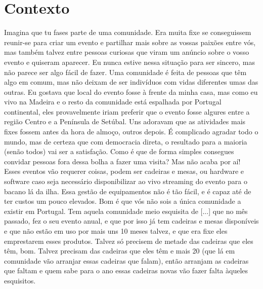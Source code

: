 \documentclass[12pt,a4paper,openright,oneside]{memoir}
\begin{document}
\section{Contexto}

Imagina que tu fases parte de uma comunidade. Era muita fixe se conseguissem
reunir-se para criar um evento e partilhar mais sobre as vossas paixões entre
vós, mas também talvez entre pessoas curiosas que viram um anúncio sobre o
vosso evento e quiseram aparecer. Eu nunca estive nessa situação para ser
sincero, mas não parece ser algo fácil de fazer. Uma comunidade é feita de
pessoas que têm algo em comum, mas não deixam de ser indivíduos com vidas
diferentes umas das outras. Eu gostava que local do evento fosse à frente da
minha casa, mas como eu vivo na Madeira e o resto da comunidade está espalhada
por Portugal continental, eles provavelmente iriam preferir que o evento fosse
algures entre a região Centro e a Península de Setúbal. Uns adoravam que as
atividades mais fixes fossem antes da hora de almoço, outros depois. É
complicado agradar todo o mundo, mas de certeza que com democracia direta, o
resultado para a maioria (senão todos) vai ser a satisfação. Como é que de
forma simples consegues convidar pessoas fora dessa bolha a fazer uma visita?
Mas não acaba por aí! Esses eventos vão requerer coisas, podem ser cadeiras e
mesas, ou hardware e software caso seja necessário disponibilizar ao vivo
streaming do evento para o bacano lá da ilha. Essa gestão de equipamentos não é
tão fácil, e é capaz até de ter custos um pouco elevados. Bom é que vós não
sois a única comunidade a existir em Portugal. Tem aquela comunidade meio
esquisita de [...] que no mês passado, fez o seu evento anual, e que por isso
já tem cadeiras e mesas disponíveis e que não estão em uso por mais uns 10
meses talvez, e que era fixe eles emprestarem esses produtos. Talvez só
precisem de metade das cadeiras que eles têm, bom. Talvez precisam das cadeiras
que eles têm e mais 20 (que lá em comunidade vão arranjar essas cadeiras que
falam), então arranjam as cadeiras que faltam e quem sabe para o ano essas
cadeiras novas vão fazer falta àqueles esquisitos.
\end{document}
